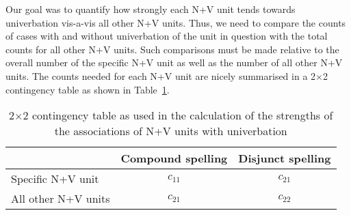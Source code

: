 \documentclass[biblatex, charis, linguex]{glossa}\usepackage{knitr}
\newcommand{\CM}[1]{\ensuremath{\mathsf{#1}}}
\begin{document}
Our goal was to quantify how strongly each N+V unit tends towards univerbation vis-a-vis all other N+V units.
Thus, we need to compare the counts of cases with and without univerbation of the unit in question with the total counts for all other N+V units.
Such comparisons must be made relative to the overall number of the specific N+V unit as well as the number of all other N+V units.
The counts needed for each N+V unit are nicely summarised in a 2$\times$2 contingency table as shown in Table~\ref{tab:associationsexplained}.

\begin{table}[!htbp]
  \begin{tabular}{lcc}
  \toprule
  & Compound spelling & Disjunct spelling \\
  \midrule
  Specific N+V unit   & $c_{11}$ & $c_{21}$ \\
  All other N+V units & $c_{21}$ & $c_{22}$ \\
  \bottomrule
  \end{tabular}
  \caption{2\CM{\times}2 contingency table as used in the calculation of the strengths of the associations of N+V units with univerbation}
  \label{tab:associationsexplained}
\end{table}
\end{document}
